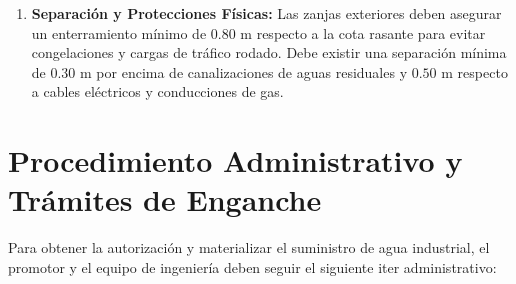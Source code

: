 \documentclass{report}
\begin{document}
\begin{enumerate}
\begin{itemize}
        \item Válvula de corte de salida y grifo de toma de muestras sanitarias para control analítico.

    \end{itemize}

    \item \textbf{Separación y Protecciones Físicas:} Las zanjas exteriores deben asegurar un enterramiento mínimo de $0.80\text{ m}$ respecto a la cota rasante para evitar congelaciones y cargas de tráfico rodado. Debe existir una separación mínima de $0.30\text{ m}$ por encima de canalizaciones de aguas residuales y $0.50\text{ m}$ respecto a cables eléctricos y conducciones de gas.

\end{enumerate}



\section{Procedimiento Administrativo y Trámites de Enganche}

Para obtener la autorización y materializar el suministro de agua industrial, el promotor y el equipo de ingeniería deben seguir el siguiente iter administrativo:
\end{document}
